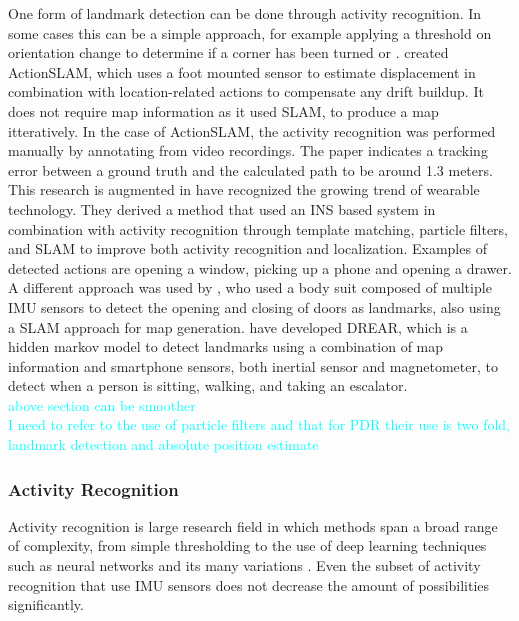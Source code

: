 One form of landmark detection can be done through activity recognition. In some cases this can be a simple approach, for example applying a threshold on orientation change to determine if a corner has been turned or \cite{Gu2019,Jackermeier2018}. \citet{Hardegger2012} created ActionSLAM, which uses a foot mounted sensor to estimate displacement in combination with location-related actions to compensate any drift buildup. It does not require map information as it used \ac{SLAM}, to produce a map itteratively. In the case of ActionSLAM, the activity recognition was performed manually by annotating from video recordings. The paper indicates a tracking error between a ground truth and the calculated path to be around 1.3 meters. This research is augmented in \citet{Hardegger2016} have recognized the growing trend of wearable technology. They derived a method that used an INS based system in combination with activity recognition through template matching, particle filters, and SLAM to improve both activity recognition and localization. Examples of detected actions are opening a window, picking up a phone and opening a drawer. \\
A different approach was used by \citet{Grzonka2010}, who used a body suit composed of multiple IMU sensors to detect the opening and closing of doors as landmarks, also using a \ac{SLAM} approach for map generation. \citet{Torok2014} have developed DREAR, which is a hidden markov model to detect landmarks using a combination of map information and smartphone sensors, both inertial sensor and magnetometer, to detect when a person is sitting, walking, and taking an escalator.\\
\textcolor{cyan}{above section can be smoother} \\ \newline
\textcolor{cyan}{ I need to refer to the use of particle filters and that for PDR their use is two fold, landmark detection and absolute position estimate}

\subsubsection{Activity Recognition}
Activity recognition is large research field in which methods span a broad range of complexity, from simple thresholding to the use of deep learning techniques such as neural networks and its many variations \cite{Lima2019}. Even the subset of activity recognition that use IMU sensors does not decrease the amount of possibilities significantly.

